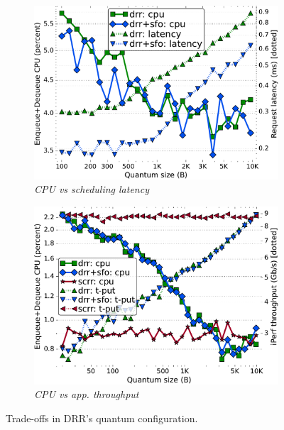 \begin{figure}[t]
    \centering
    \begin{subfigure}[t]{.49\linewidth}
        \centering
        \includegraphics[width=1\linewidth]{figs/burst_cn_2t4x8_mn_2tb2x4_crs_500_kp_lat_drr_basic_fq_drr.pdf}
        \vspace{-2mm}
        \caption{\small{\textit{CPU vs scheduling latency}}}
	\label{fig:quanta-cpu-lat}
    \end{subfigure}
    \begin{subfigure}[t]{.49\linewidth}
      \centering
      \includegraphics[width=1\linewidth]{figs/burst_cn_6u1x100_Cb_2G_kp_bw_drr_basic_fq_drr_scrr-neia.pdf}
      \vspace{-2mm}
      \caption{\small{\textit{CPU vs app. throughput}}}
      \label{fig:quanta-cpu-bw}
    \end{subfigure}
    \vspace{-1mm}
    \caption{\small{
        Trade-offs in DRR's quantum configuration.}}
    
    \label{fig:quanta-tradeoff}
    \vspace{-2mm}
\end{figure}

